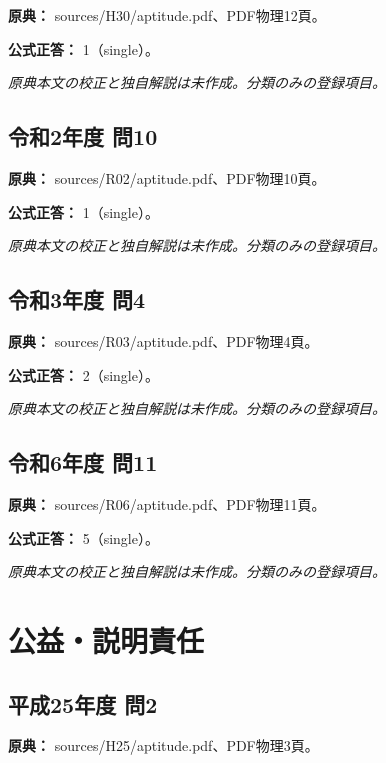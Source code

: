 \noindent\textbf{原典：} sources/H30/aptitude.pdf、PDF物理12頁。

\textbf{公式正答：} 1（single）。

\par\textit{原典本文の校正と独自解説は未作成。分類のみの登録項目。}

\subsection{令和2年度 問10}
\label{q:r02-reg-apt-10}

\noindent\textbf{原典：} sources/R02/aptitude.pdf、PDF物理10頁。

\textbf{公式正答：} 1（single）。

\par\textit{原典本文の校正と独自解説は未作成。分類のみの登録項目。}

\subsection{令和3年度 問4}
\label{q:r03-reg-apt-04}

\noindent\textbf{原典：} sources/R03/aptitude.pdf、PDF物理4頁。

\textbf{公式正答：} 2（single）。

\par\textit{原典本文の校正と独自解説は未作成。分類のみの登録項目。}

\subsection{令和6年度 問11}
\label{q:r06-reg-apt-11}

\noindent\textbf{原典：} sources/R06/aptitude.pdf、PDF物理11頁。

\textbf{公式正答：} 5（single）。

\par\textit{原典本文の校正と独自解説は未作成。分類のみの登録項目。}

\section{公益・説明責任}

\subsection{平成25年度 問2}
\label{q:h25-reg-apt-02}

\noindent\textbf{原典：} sources/H25/aptitude.pdf、PDF物理3頁。

